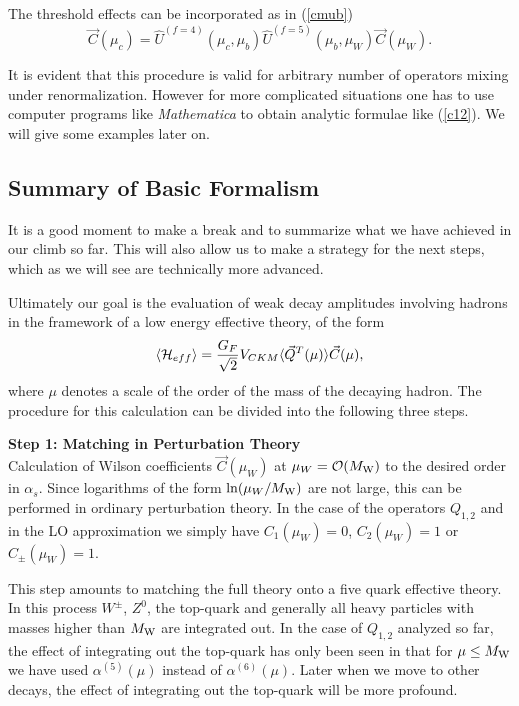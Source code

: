 \documentclass[12pt,rotate]{article}
\def\as{\alpha_s}
\newcommand{\mw}{M_{\rm W}}
\newcommand{\ord}{{\cal O}}
\begin{document}
\begin{itemize}
\begin{itemize}
\begin{itemize}
The threshold effects can be incorporated as in (\ref{cmub})
\begin{equation}\label{cmub1}
 \vec C(\mu_c)=\hat U^{(f=4)}(\mu_c,\mu_b)\hat U^{(f=5)}(\mu_b, \mu_W) 
\vec C(\mu_W).
\end{equation}

It is evident that this procedure is valid for arbitrary number
of operators mixing under renormalization. However for more
complicated situations one has to use computer programs like 
{\it Mathematica}
to obtain analytic formulae like (\ref{c12}). We will give
some examples later on.

\subsection{Summary of Basic Formalism }
            \label{sec:basicform:summary}
It is a good moment to make a break and to summarize what we have
achieved in our climb so far. This will also allow us to make
a strategy for the next steps, which as we will see are technically
more advanced.

Ultimately our goal is the evaluation of weak decay amplitudes
involving hadrons in the framework of a low energy effective theory,
of the form
\begin{displaymath}
\langle {\cal H}_{eff}\rangle={G_F\over\sqrt{2}}V_{CKM}
\langle \vec Q^T(\mu)\rangle \vec C(\mu),
\end{displaymath}
where $\mu$ denotes a scale of the order of the mass of the decaying
hadron.
The procedure for this calculation can be divided into the
following three steps.

\noindent
{\bf Step 1: Matching in Perturbation Theory}
\\
Calculation of Wilson coefficients $\vec C(\mu_W)$ at
$\mu_W=\ord(\mw)$ to the desired order in $\as$.  
Since
logarithms of the form $\ln(\mu_W/\mw)$ are not large, this can be
performed in ordinary perturbation theory. 
In the case
of the operators $Q_{1,2}$ and in the LO approximation we
simply have $C_1(\mu_W)=0$, $C_2(\mu_W)=1$ or $C_\pm(\mu_W)=1$.

This step
amounts to matching
the full theory onto a five quark effective theory.
In this process $W^\pm$, $Z^0$, the top-quark and generally
all heavy particles with masses higher than $\mw$ are integrated
out. In the case of $Q_{1,2}$ analyzed so far, the effect of 
integrating out the top-quark has only been seen in that for
$\mu\le\mw$ we have used $\alpha^{(5)}(\mu)$ instead of
 $\alpha^{(6)}(\mu)$. Later when we move to other decays,
the effect of integrating out the top-quark will be more profound.


\end{itemize}
\end{itemize}
\end{itemize}
\end{document}
